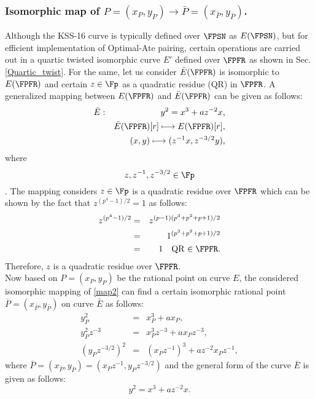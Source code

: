 \subsubsection*{Isomorphic map of $P=(x_P,y_P) \to \bar P=(x_{\bar P},y_{\bar P})$.}
Although the KSS-16 curve is typically defined over $\FPSN$ as $E(\FPSN)$, but for efficient implementation of Optimal-Ate pairing, certain operations are carried out in a quartic twisted isomorphic curve $E'$ defined over $\FPFR$ as shown in Sec. \ref{Quartic_twist}. 
For the same, let us consider $\bar{E}(\FPFR)$ is isomorphic to $E(\FPFR)$ and certain $z \in \Fp$ as a quadratic residue (QR) in $\FPFR$. 
A generalized mapping between $E(\FPFR)$ and $\bar{E}(\FPFR)$ can be given as follows:
\begin{eqnarray}
	\bar{E}&:&y^2=x^3+az^{-2}x,\nonumber\\
	&&\bar{E}(\FPFR)[r]\longmapsto E(\FPFR)[r],\nonumber\\
	&&(x,y)\longmapsto (z^{-1}x,z^{-3/2}y),\label{map2}\nonumber\\
\end{eqnarray}
	 where $$z, z^{-1},z^{-3/2}\in \Fp$$.
The mapping considers $z \in \Fp$ is a quadratic residue over $\FPFR$ which can be shown by the fact that $z^{(p^4-1)/2} = 1$ as follows:
\begin{eqnarray}
 z^{(p^4-1)/2}& = &z^{(p-1)(p^3+p^2+p+1)/2 } \nonumber \\
& = &1^{(p^3+p^2+p+1)/2 } \nonumber \\
& = & 1 \quad \text{QR $\in \FPFR$}.
\end{eqnarray}
Therefore, $z$ is a quadratic residue over $\FPFR$.\\
Now  based on $P= (x_P, y_P)$ be the rational point on curve $E$, the considered isomorphic mapping of \eqref{map2}  can find a certain isomorphic rational point $\bar P = (x_{\bar P}, y_{\bar P})$ on curve $\bar E$ as follows:
\begin{eqnarray}\label{bar_P}
y_P^2 & = & x_P^3+ax_P, \nonumber \\
y_P^2 z^{-3}& = & x_P^3 z^{-3} +ax_Pz^{-3}, \nonumber \\
(y_P z^{-3/2})^2& = & (x_Pz^{-1})^3 +az^{-2} x_Pz^{-1},
\end{eqnarray}
where $\bar P = (x_{\bar P}, y_{\bar P}) = (x_P z^{-1},y_P z^{-3/2})$ and the general form of the curve $\bar E$ is given as follows:
\begin{equation}\label{isomorphic_E_bar}
y^2 = x^3+az^{-2}x.
\end{equation}

